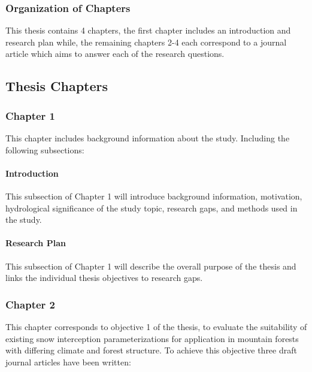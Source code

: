 \documentclass[
  letterpaper,
  DIV=11,
  numbers=noendperiod]{scrartcl}
\let\oldparagraph\paragraph
\renewcommand{\paragraph}[1]{\oldparagraph{#1}\mbox{}}
\begin{document}
\subsubsection{Organization of Chapters}\label{organization-of-chapters}

This thesis contains 4 chapters, the first chapter includes an
introduction and research plan while, the remaining chapters 2-4 each
correspond to a journal article which aims to answer each of the
research questions.

\subsection{Thesis Chapters}\label{thesis-chapters}

\subsubsection{Chapter 1}\label{chapter-1}

This chapter includes background information about the study. Including
the following subsections:

\paragraph{Introduction}\label{introduction}

This subsection of Chapter 1 will introduce background information,
motivation, hydrological significance of the study topic, research gaps,
and methods used in the study.

\paragraph{Research Plan}\label{research-plan}

This subsection of Chapter 1 will describe the overall purpose of the
thesis and links the individual thesis objectives to research gaps.

\subsubsection{Chapter 2}\label{chapter-2}

This chapter corresponds to objective 1 of the thesis, to evaluate the
suitability of existing snow interception parameterizations for
application in mountain forests with differing climate and forest
structure. To achieve this objective three draft journal articles have
been written:
\end{document}
